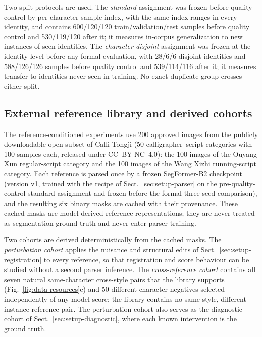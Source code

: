 Two split protocols are used. The \emph{standard} assignment was frozen
before quality control by per-character sample index, with the same index
ranges in every identity, and contains 600/120/120 train/validation/test
samples before quality control and 530/119/120 after it; it measures
in-corpus generalization to new instances of seen identities. The
\emph{character-disjoint} assignment was frozen at the identity level before
any formal evaluation, with 28/6/6 disjoint identities and 588/126/126
samples before quality control and 539/114/116 after it; it measures
transfer to identities never seen in training. No exact-duplicate group
crosses either split.

\subsection{External reference library and derived cohorts}
\label{sec:data-references}

The reference-conditioned experiments use 200 approved images from the
publicly downloadable open subset of Calli-Tongji \cite{yunmo_jixin_2025}
(50 calligrapher--script categories with 100 samples each, released under
CC~BY-NC~4.0): the 100 images of the Ouyang Xun regular-script category and
the 100 images of the Wang Xizhi running-script category. Each
reference is parsed once by a frozen SegFormer-B2 checkpoint (version v1,
trained with the recipe of Sect.~\ref{sec:setup-parser} on the
pre-quality-control standard assignment and frozen before the formal
three-seed comparison), and the resulting six binary masks are cached with their provenance. These cached masks are model-derived reference
representations; they are never treated as segmentation ground truth and
never enter parser training.

Two cohorts are derived deterministically from the cached masks. The
\emph{perturbation cohort} applies the nuisance and structural edits of
Sect.~\ref{sec:setup-registration} to every reference, so that registration
and score behaviour can be studied without a second parser inference. The
\emph{cross-reference cohort} contains all seven natural
same-character cross-style pairs that the library supports
(Fig.~\ref{fig:data-resources}c) and 50 different-character negatives selected independently of any model score; the
library contains no same-style, different-instance reference pair. The perturbation cohort also serves as the diagnostic cohort of
Sect.~\ref{sec:setup-diagnostic}, where each known intervention is the
ground truth.


